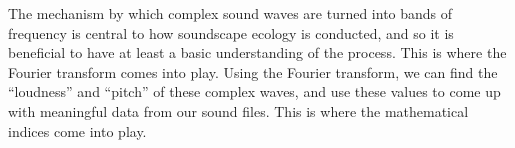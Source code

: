 \begin{flushleft}
The mechanism by which complex sound waves are turned into bands of frequency is central to how soundscape ecology is conducted, and so it is beneficial to have at least a basic understanding of the process. This is where the Fourier transform comes into play. Using the Fourier transform, we can find the ``loudness'' and ``pitch'' of these complex waves, and use these values to come up with meaningful data from our sound files. This is where the mathematical indices come into play.
\end{flushleft}
